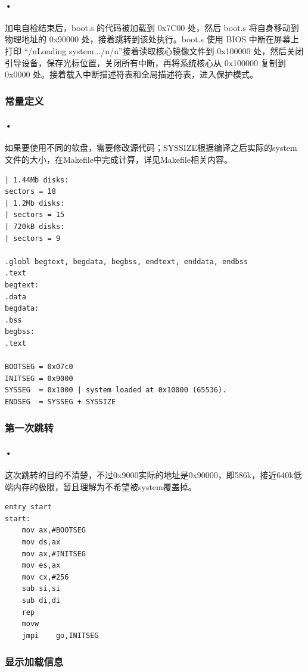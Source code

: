 \documentclass[12pt]{article}
\begin{document}
\paragraph{•}
加电自检结束后，boot.s 的代码被加载到 0x7C00 处，然后 boot.s 将自身移动到物理地址的 0x90000 处，接着跳转到该处执行。boot.s 使用 BIOS 中断在屏幕上打印 “/nLoading system.../n/n”接着读取核心镜像文件到 0x100000 处，然后关闭引导设备，保存光标位置，关闭所有中断，再将系统核心从 0x100000 复制到 0x0000 处。接着载入中断描述符表和全局描述符表，进入保护模式。
\subsubsection{常量定义}
\paragraph{•}
如果要使用不同的软盘，需要修改源代码；SYSSIZE根据编译之后实际的system文件的大小，在Makefile中完成计算，详见Makefile相关内容。
\begin{lstlisting}
| 1.44Mb disks:
sectors = 18
| 1.2Mb disks:
| sectors = 15
| 720kB disks:
| sectors = 9

.globl begtext, begdata, begbss, endtext, enddata, endbss
.text
begtext:
.data
begdata:
.bss
begbss:
.text

BOOTSEG = 0x07c0
INITSEG = 0x9000
SYSSEG  = 0x1000 | system loaded at 0x10000 (65536).
ENDSEG	= SYSSEG + SYSSIZE
\end{lstlisting}
\subsubsection{第一次跳转}
\paragraph{•}
这次跳转的目的不清楚，不过0x9000实际的地址是0x90000，即586k，接近640k低端内存的极限，暂且理解为不希望被system覆盖掉。
\begin{lstlisting}
entry start
start:
	mov	ax,#BOOTSEG
	mov	ds,ax
	mov	ax,#INITSEG
	mov	es,ax
	mov	cx,#256
	sub	si,si
	sub	di,di
	rep
	movw
	jmpi	go,INITSEG
\end{lstlisting}	

\subsubsection{显示加载信息}
\end{document}
